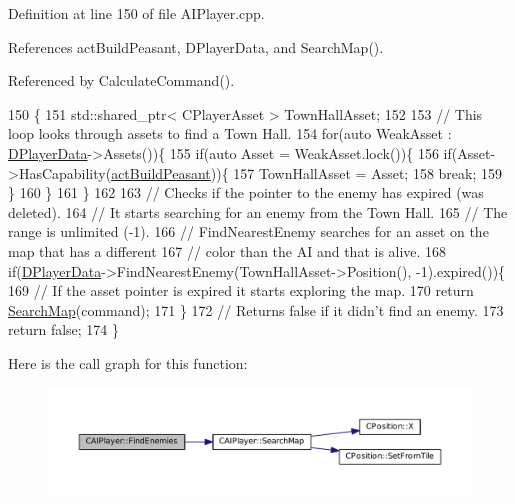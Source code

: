 Definition at line 150 of file A\+I\+Player.\+cpp.



References act\+Build\+Peasant, D\+Player\+Data, and Search\+Map().



Referenced by Calculate\+Command().


\begin{DoxyCode}
150                                                          \{
151     std::shared\_ptr< CPlayerAsset > TownHallAsset;
152     
153     \textcolor{comment}{// This loop looks through assets to find a Town Hall.}
154     \textcolor{keywordflow}{for}(\textcolor{keyword}{auto} WeakAsset : \hyperlink{classCAIPlayer_a83b5113c8f7e80df54940b647c5ee2e6}{DPlayerData}->Assets())\{
155         \textcolor{keywordflow}{if}(\textcolor{keyword}{auto} Asset = WeakAsset.lock())\{
156             \textcolor{keywordflow}{if}(Asset->HasCapability(\hyperlink{GameDataTypes_8h_a35b98ce26aca678b03c6f9f76e4778cea66c601dce0fc095460b3c2c25f66ee71}{actBuildPeasant}))\{
157                 TownHallAsset = Asset;
158                 \textcolor{keywordflow}{break};
159             \}
160         \}
161     \}
162 
163     \textcolor{comment}{// Checks if the pointer to the enemy has expired (was deleted).}
164     \textcolor{comment}{// It starts searching for an enemy from the Town Hall. }
165     \textcolor{comment}{// The range is unlimited (-1).}
166     \textcolor{comment}{// FindNearestEnemy searches for an asset on the map that has a different }
167     \textcolor{comment}{// color than the AI and that is alive.}
168     \textcolor{keywordflow}{if}(\hyperlink{classCAIPlayer_a83b5113c8f7e80df54940b647c5ee2e6}{DPlayerData}->FindNearestEnemy(TownHallAsset->Position(), -1).expired())\{
169         \textcolor{comment}{// If the asset pointer is expired it starts exploring the map.}
170         \textcolor{keywordflow}{return} \hyperlink{classCAIPlayer_afafbe8fc589e09a16ae1f02f2794d7b0}{SearchMap}(command);
171     \}
172     \textcolor{comment}{// Returns false if it didn't find an enemy.}
173     \textcolor{keywordflow}{return} \textcolor{keyword}{false};    
174 \}
\end{DoxyCode}
Here is the call graph for this function\+:\nopagebreak
\begin{figure}[H]
\begin{center}
\leavevmode
\includegraphics[width=350pt]{classCAIPlayer_a33b1533570e7a00114d1b85b3551e395_cgraph}
\end{center}
\end{figure}
